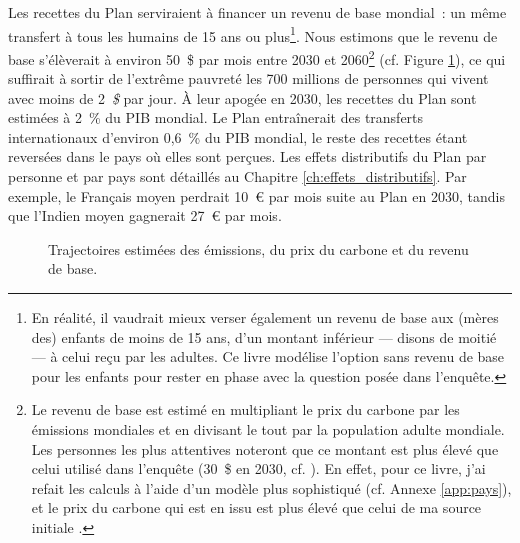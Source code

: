 \documentclass[a5paper,french,openany]{memoir}
\begin{document}
Les recettes du Plan serviraient à financer un revenu de base mondial~: un même transfert à tous les humains de 15 ans ou plus\footnote{En réalité, il vaudrait mieux verser également un revenu de base aux (mères des) enfants de moins de 15 ans, d'un montant inférieur --- disons de moitié --- à celui reçu par les adultes. Ce livre modélise l'option sans revenu de base pour les enfants pour rester en phase avec la question posée dans l'enquête.%
}. 
Nous estimons que le revenu de base s'élèverait à environ 50~\$ par mois entre 2030 et 2060\footnote{Le revenu de base est estimé en multipliant le prix du carbone par les émissions mondiales et en divisant le tout par la population adulte mondiale. Les personnes les plus attentives noteront que ce montant est plus élevé que celui utilisé dans l'enquête (30~\$ en 2030, cf. \citealp{fabre_global_2023}). En effet, pour ce livre, j'ai refait les calculs à l'aide d'un modèle plus sophistiqué (cf. Annexe \ref{app:pays}), et le prix du carbone qui est en issu est plus élevé que celui de ma source initiale \citep{stern_report_2017}.} (cf. Figure \ref{fig:trajectory}), 
ce qui suffirait à sortir de l'extrême pauvreté les 700 millions de personnes qui vivent avec moins de 2~\textit{\$} par jour. À leur apogée en 2030, les recettes du Plan sont estimées à 2~\% du PIB mondial. Le Plan entraînerait des transferts internationaux d'environ 0,6~\% %
du PIB mondial, le reste %
des recettes étant reversées dans le pays où elles sont perçues. 
Les effets distributifs du Plan par personne et par pays sont détaillés au Chapitre \ref{ch:effets_distributifs}. 
Par exemple, le Français moyen perdrait 10~\euro{} par mois suite au Plan en 2030, tandis que l'Indien moyen gagnerait 27~\euro{} par mois. %

\begin{figure}[h!]
  \caption[Trajectoires (émissions, prix, revenu de base)]{Trajectoires estimées des émissions, du prix du carbone et du revenu de base.}\label{fig:trajectory}
\end{figure} 
\end{document}
